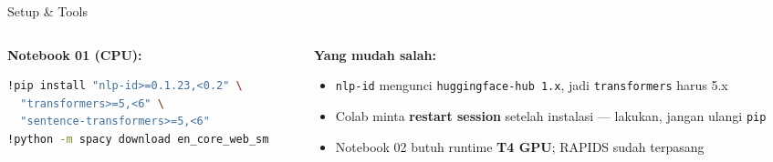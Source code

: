 \documentclass[aspectratio=169,t]{beamer}
\begin{document}
\begin{frame}[fragile]{Setup \& Tools}
  \begin{columns}[T]
    \begin{column}{0.5\textwidth}
      \textcolor{nvgreen}{\textbf{Notebook 01 (CPU):}}
      \begin{lstlisting}[language=bash, basicstyle=\ttfamily\scriptsize\color{nvwhite}]
!pip install "nlp-id>=0.1.23,<0.2" \
  "transformers>=5,<6" \
  "sentence-transformers>=5,<6"
!python -m spacy download en_core_web_sm
      \end{lstlisting}
    \end{column}
    \begin{column}{0.46\textwidth}
      \textcolor{nvorange}{\textbf{Yang mudah salah:}}
      \begin{itemize}
        \footnotesize
        \item \texttt{nlp-id} mengunci \texttt{huggingface-hub 1.x}, jadi \texttt{transformers} harus 5.x
        \item Colab minta \textbf{restart session} setelah instalasi --- lakukan, jangan ulangi \texttt{pip}
        \item Notebook 02 butuh runtime \textbf{T4 GPU}; RAPIDS sudah terpasang
      \end{itemize}
    \end{column}
  \end{columns}
\end{frame}
\end{document}
